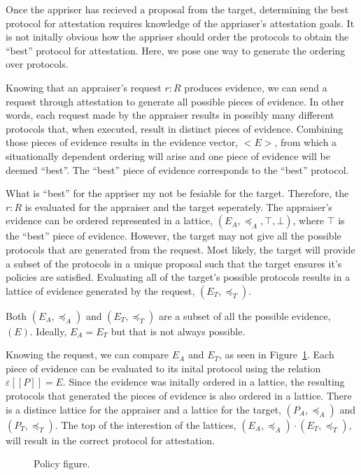\documentclass[sigconf,authordraft]{acmart}
\begin{document}
Once the appriser has recieved a proposal from the target, determining
the best protocol for attestation requires knowledge of the
appriaser's attestation goals. It is not initally obvious how the
appriser should order the protocols to obtain the ``best'' protocol for
attestation. Here, we pose one way to generate the ordering over
protocols.

Knowing that an appraiser's request $r:R$ produces evidence, we can
send a request through attestation to generate all possible pieces of
evidence. In other words, each request made by the appraiser
results in possibly many different protocols that, when executed,
result in distinct pieces of evidence. Combining those pieces of
evidence results in the evidence vector,  $<E>$, from which a situationally
dependent ordering will arise and one piece of evidence will be deemed
``best''. The ``best'' piece of evidence corresponds to the ``best'' protocol. 

What is ``best'' for the appriser my not be fesiable for the
target. Therefore, the $r:R$ is evaluated for the appraiser and the
target seperately. The appraiser's evidence can be ordered represented
in a lattice, $(E_A,\preceq_A, \top, \bot)$, where $\top$ is the
``best'' piece of evidence. However, the target may not give all the
possible protocols that are generated from the request. Most likely,
the target will provide a subset of the protocols in a unique proposal
such that the target ensures it's policies are satisfied. Evaluating
all of the target's possible protocols results in a lattice of
evidence generated by the request, $(E_T,\preceq_T)$.

Both $(E_A,\preceq_A)$ and $(E_T,\preceq_T)$ are a subset of all the
possible evidence, $(E)$. Ideally, $E_A = E_T$ but that is not always
possible.

Knowing the request, we can compare $E_A$ and $E_T$, as seen in
Figure~\ref{fig:policy-fig-embed}. Each piece of evidence can be
evaluated to its inital protocol using the relation
$\varepsilon [\![P]\!] = E$. Since the evidence was initally ordered
in a lattice, the resulting protocols that generated the pieces of
evidence is also ordered in a lattice. There is a distince lattice for
the appraiser and a lattice for the target, $(P_A,\preceq_A)$ and
$(P_T,\preceq_T)$. The top of the interestion of the lattices,
$(E_A,\preceq_A) \cdot (E_T,\preceq_T)$, will result in the correct
protocol for attestation.

\begin{figure}[hbtp]
  \centering 
  \caption[Attestation process]{Policy figure.}
  \label{fig:policy-fig-embed}
\end{figure}
\end{document}
